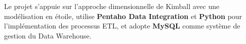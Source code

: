 \documentclass[12pt,a4paper]{report}
\begin{document}
Le projet s’appuie sur l’approche dimensionnelle de Kimball avec une modélisation en étoile, utilise \textbf{Pentaho Data Integration} et \textbf{Python} pour l’implémentation des processus ETL, et adopte \textbf{MySQL} comme système de gestion du Data Warehouse.






\cleardoublepage


\end{document}
